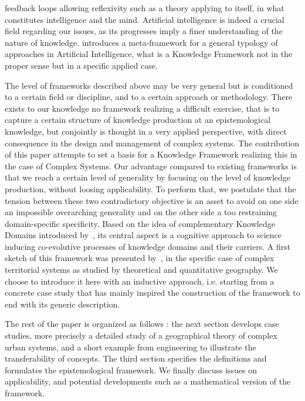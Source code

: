 \documentclass[runningheads,a4paper]{llncs2e/llncs}
\begin{document}
feedback loops allowing reflexivity such as a theory applying to itself, in what constitutes intelligence and the mind. Artificial intelligence is indeed a crucial field regarding our issues, as its progresses imply a finer understanding of the nature of knowledge. \cite{2017arXiv170401407M} introduces a meta-framework for a general typology of approaches in Artificial Intelligence, what is a Knowledge Framework not in the proper sense but in a specific applied case.



The level of frameworks described above may be very general but is conditioned to a certain field or discipline, and to a certain approach or methodology. There exists to our knowledge no framework realizing a difficult exercise, that is to capture a certain structure of knowledge production at an epistemological knowledge, but conjointly is thought in a very applied perspective, with direct consequence in the design and management of complex systems. The contribution of this paper attempts to set a basis for a Knowledge Framework realizing this in the case of Complex Systems. Our advantage compared to existing frameworks is that we reach a certain level of generality by focusing on the level of knowledge production, without loosing applicability. To perform that, we postulate that the tension between these two contradictory objective is an asset to avoid on one side an impossible overarching generality and on the other side a too restraining domain-specific specificity. Based on the idea of complementary Knowledge Domains introduced by~\cite{livet2010}, its central aspect is a cognitive approach to science inducing co-evolutive processes of knowledge domains and their carriers. A first sketch of this framework was presented by~\cite{raimbault:halshs-01505084}, in the specific case of complex territorial systems as studied by theoretical and quantitative geography. We choose to introduce it here with an inductive approach, i.e. starting from a concrete case study that has mainly inspired the construction of the framework to end with its generic description.


The rest of the paper is organized as follows : the next section develops case studies, more precisely a detailed study of a geographical theory of complex urban systems, and a short example from engineering to illustrate the transferability of concepts. The third section specifies the definitions and formulates the epistemological framework. We finally discuss issues on applicability, and potential developments such as a mathematical version of the framework.
\end{document}
